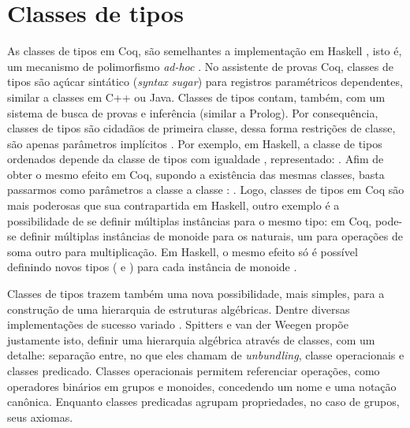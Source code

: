 \section{Classes de tipos}\label{sec:classes}
As classes de tipos em Coq, são semelhantes a implementação em Haskell \cite{Hall1996}, isto é, um mecanismo de polimorfismo \textit{ad-hoc} \cite{Wadler1989}. No assistente de provas Coq, classes de tipos são açúcar sintático (\textit{syntax sugar}) para registros paramétricos dependentes, similar a classes em C++ ou Java. Classes de tipos contam, também, com um sistema de busca de provas e inferência (similar a Prolog). Por consequência, classes de tipos são cidadãos de primeira classe, dessa forma restrições de classe, são apenas parâmetros implícitos \cite{Sozeau2008}. Por exemplo, em Haskell, a classe de tipos ordenados depende da classe de tipos com igualdade \cite{HaskellOrd}, representado: . Afim de obter o mesmo efeito em Coq, supondo a existência das mesmas classes, basta passarmos como parâmetros a classe  a classe : . Logo, classes de tipos em Coq são mais poderosas que sua contrapartida em Haskell, outro exemplo é a possibilidade de se definir múltiplas instâncias para o mesmo tipo: em Coq, pode-se definir múltiplas instâncias de monoide para os naturais, um para operações de soma outro para multiplicação. Em Haskell, o mesmo efeito só é possível definindo novos tipos ( e ) para cada instância de monoide \cite{HaskellMonoid}.

Classes de tipos trazem também uma nova possibilidade, mais simples, para a construção de uma hierarquia de estruturas algébricas. Dentre diversas implementações de sucesso variado \cite{Geuvers2002,CruzFilipe2004,Garillot2009,Cohen2020}. Spitters e van der Weegen \cite{Spitters2011} propõe justamente isto, definir uma hierarquia algébrica através de classes, com um detalhe: separação entre, no que eles chamam de \textit{unbundling}, classe operacionais e classes predicado. Classes operacionais permitem referenciar operações, como operadores binários em grupos e monoides, concedendo um nome e uma notação canônica. Enquanto classes predicadas agrupam propriedades, no caso de grupos, seus axiomas. 

